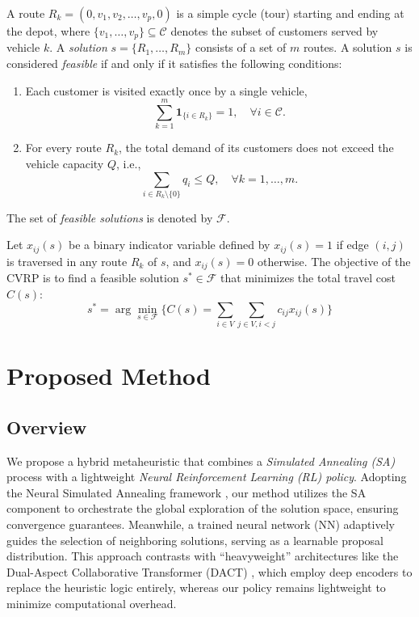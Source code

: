 \documentclass[letterpaper]{article} %
\begin{document}
A route $R_k = (0, v_1, v_2, \ldots, v_p, 0)$ is a simple cycle (tour) starting and ending at the depot, where $\{v_1, \ldots, v_p\} \subseteq \mathcal{C}$ denotes the subset of customers served by vehicle $k$. A \textit{solution} $s = \{R_1, \ldots, R_m\}$ consists of a set of $m$ routes. A solution $s$ is considered \textit{feasible} if and only if it satisfies the following conditions:
\begin{enumerate}
    \item Each customer is visited exactly once by a single vehicle,
    $$
    \sum_{k=1}^{m} \mathbf{1}_{\{i \in R_k\}} = 1, \quad \forall i \in \mathcal{C} .
    $$
    \item For every route $R_k$, the total demand of its customers does not exceed the vehicle capacity $Q$, i.e.,
    $$
    \sum_{i \in R_k \setminus \{0\}} q_i \leq Q, \quad \forall k = 1, \ldots, m.
    $$
\end{enumerate}
The set of \textit{feasible solutions} is denoted by $\mathcal{F}$.

Let $x_{ij}(s)$ be a binary indicator variable defined by $x_{ij}(s) = 1$ if edge $(i,j)$ is traversed in any route $R_k$ of $s$, and $x_{ij}(s) = 0$ otherwise. The objective of the CVRP is to find a feasible solution $s^* \in \mathcal{F}$ that minimizes the total travel cost $C(s)$:
$$
s^* = \arg\min_{s \in \mathcal{F}} \Big\{ C(s) = \sum_{i \in V} \sum_{j \in V, i < j} c_{ij} x_{ij}(s) \Big\}
$$

\section{Proposed Method}

\subsection{Overview}

We propose a hybrid metaheuristic that combines a \textit{Simulated Annealing (SA)} process with a lightweight \textit{Neural Reinforcement Learning (RL) policy}. Adopting the Neural Simulated Annealing framework \citep{correia_neural_2023}, our method utilizes the SA component to orchestrate the global exploration of the solution space, ensuring convergence guarantees. Meanwhile, a trained neural network (NN) adaptively guides the selection of neighboring solutions, serving as a learnable proposal distribution. This approach contrasts with ``heavyweight'' architectures like the Dual-Aspect Collaborative Transformer (DACT) \citep{ma_learning_2021}, which employ deep encoders to replace the heuristic logic entirely, whereas our policy remains lightweight to minimize computational overhead.
\end{document}
